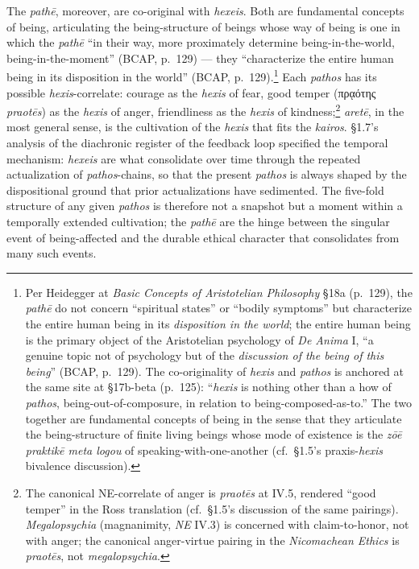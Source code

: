 \documentclass{article}
\newcommand{\gk}[1]{{\greekfont #1}}
\begin{document}
The \textit{pathē}, moreover, are co-original with \textit{hexeis}. Both are fundamental concepts of being, articulating the being-structure of beings whose way of being is one in which the \textit{pathē} ``in their way, more proximately determine being-in-the-world, being-in-the-moment'' (BCAP, p.~129) --- they ``characterize the entire human being in its disposition in the world'' (BCAP, p.~129).\footnote{Per Heidegger at \textit{Basic Concepts of Aristotelian Philosophy} \S 18a (p.~129), the \textit{pathē} do not concern ``spiritual states'' or ``bodily symptoms'' but characterize the entire human being in its \textit{disposition in the world}; the entire human being is the primary object of the Aristotelian psychology of \textit{De Anima} I, ``a genuine topic not of psychology but of the \textit{discussion of the being of this being}'' (BCAP, p.~129). The co-originality of \textit{hexis} and \textit{pathos} is anchored at the same site at \S 17b-beta (p.~125): ``\textit{hexis} is nothing other than a how of \textit{pathos}, being-out-of-composure, in relation to being-composed-as-to.'' The two together are fundamental concepts of being in the sense that they articulate the being-structure of finite living beings whose mode of existence is the \textit{zō\=e praktik\=e meta logou} of speaking-with-one-another (cf.~\S 1.5's praxis-\textit{hexis} bivalence discussion).} Each \textit{pathos} has its possible \textit{hexis}-correlate: courage as the \textit{hexis} of fear, good temper (\gk{πρᾳότης} \textit{praot\=es}) as the \textit{hexis} of anger, friendliness as the \textit{hexis} of kindness;\footnote{The canonical NE-correlate of anger is \textit{praot\=es} at IV.5, rendered ``good temper'' in the Ross translation (cf.~\S 1.5's discussion of the same pairings). \textit{Megalopsychia} (magnanimity, \textit{NE} IV.3) is concerned with claim-to-honor, not with anger; the canonical anger-virtue pairing in the \textit{Nicomachean Ethics} is \textit{praot\=es}, not \textit{megalopsychia}.} \textit{aretē}, in the most general sense, is the cultivation of the \textit{hexis} that fits the \textit{kairos}. \S1.7's analysis of the diachronic register of the feedback loop specified the temporal mechanism: \textit{hexeis} are what consolidate over time through the repeated actualization of \textit{pathos}-chains, so that the present \textit{pathos} is always shaped by the dispositional ground that prior actualizations have sedimented. The five-fold structure of any given \textit{pathos} is therefore not a snapshot but a moment within a temporally extended cultivation; the \textit{pathē} are the hinge between the singular event of being-affected and the durable ethical character that consolidates from many such events.
\end{document}
